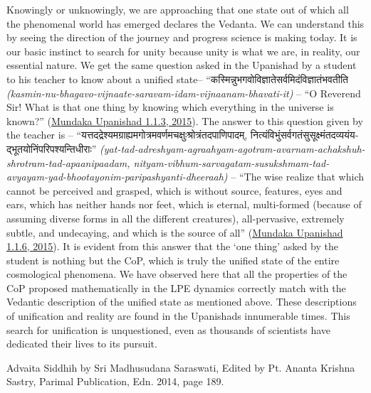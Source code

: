 \documentclass[twoside, 13pt]{article}
\begin{document}
{{{\fontsize{12}{14}\selectfont Knowingly or unknowingly, we are approaching that one state out of which all the phenomenal world has emerged declares the Vedanta. We can understand this by seeing the direction of the journey and progress science is making today. It is our basic instinct to search for unity because unity is what we are, in reality, our essential nature. We get the same question asked in the Upanishad by a student to his teacher to know about a unified state– \foreignlanguage{hindi}{{\fontsize{9}{11}\selectfont “कस्मिन्नुभगवोविज्ञातेसर्वमिदंविज्ञातंभवतीति }}\textit{(kasmin-nu-bhagavo-vijnaate-saravam-idam-vijnaanam-bhavati-it)} – “O Reverend Sir! What is that one thing by knowing which everything in the universe is known?” (\underline{Mundaka Upanishad 1.1.3, 2015}). The answer to this question given by the teacher is – \foreignlanguage{hindi}{{\fontsize{9}{11}\selectfont “यत्तदद्रेश्यमग्राह्यमगोत्रमवर्णमचक्षुःश्रोत्रंतदपाणिपादम्, नित्यंविभुंसर्वगतंसुसूक्ष्मंतदव्ययंयद्भूतयोनिंपरिपश्यन्तिधीराः”}} \textit{(yat-tad-adreshyam-agraahyam-agotram-avarn\break am-achakshuh-shrotram-tad-apaanipaadam, nityam-vibhum-sarvagatam-susukshmam-\break tad-avyayam-yad-bhootayonim-paripashyanti-dheeraah)} – “The wise realize that which cannot be perceived and grasped, which is without source, features, eyes and ears, which has neither hands nor feet, which is eternal, multi-formed (because of assuming diverse forms in all the different creatures), all-pervasive, extremely subtle, and undecaying, and which is the source of all” (\underline{Mundaka Upanishad 1.1.6, 2015}). It is evident from this answer that the ‘one thing’ asked by the student is nothing but the CoP, which is truly the unified state of the entire cosmological phenomena. We have observed here that all the properties of the CoP proposed mathematically in the LPE dynamics correctly match with the Vedantic description of the unified state as mentioned above. These descriptions of unification and reality are found in the Upanishads innumerable times. This search for unification is unquestioned, even as thousands of scientists have dedicated their lives to its pursuit.}


{\fontsize{12}{14}\selectfont
\begin{thebibliography}{99}

\bibitem{} Advaita Siddhih by Sri Madhusudana Saraswati, Edited by Pt. Ananta Krishna Sastry, Parimal Publication, Edn. 2014, page 189.


\end{thebibliography}}}}
\end{document}
